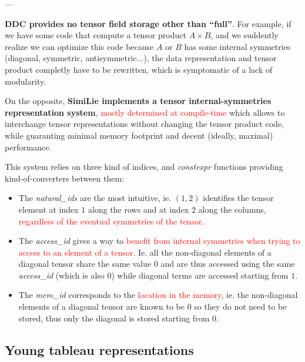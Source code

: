 \documentclass[9pt, svgnames, aspectratio=32, handout]{beamer}
\newenvironment{tframe}[1][]{%
  \begin{frame}[fragile,environment=tframe]{%
    \normalsize{{\bfseries \secname} --- \small{\subsecname} #1}%
  }%
}{%
  \end{frame}%
}
\begin{document}
\begin{tframe}
\textbf{DDC provides no tensor field storage other than ``full''}. For example, if we have some code that compute a tensor product $A\times B$, and we suddently realize we can optimize this code because $A$ or $B$ has some internal symmetries (diagonal, symmetric, antisymmetric...), the data representation and tensor product completly have to be rewritten, which is symptomatic of a lack of modularity.

On the opposite, \textbf{SimiLie implements a tensor internal-symmetries representation system}, \textcolor{red}{mostly determined at compile-time} which allows to interchange tensor representations without changing the tensor product code, while guaranting minimal memory footprint and decent (ideally, maximal) performance.

\small
This system relies on three kind of indices, and \textit{constexpr} functions providing kind-of-converters between them:

\begin{itemize}
\item The \textit{natural\_ids} are the most intuitive, ie. $(1, 2)$ identifies the tensor element at index $1$ along the rows and at index $2$ along the columns, \textcolor{red}{regardless of the eventual symmetries of the tensor}.
\item The \textit{access\_id} gives a way to \textcolor{red}{benefit from internal symmetries when trying to access to an element of a tensor}. Ie. all the non-diagonal elements of a diagonal tensor share the same value $0$ and are thus accessed using the same \textit{access\_id} (which is also $0$) while diagonal terms are accessed starting from $1$.
\item The \textit{mem\_id} corresponds to the \textcolor{red}{location in the memory}, ie. the non-diagonal elements of a diagonal tensor are known to be $0$ so they do not need to be stored, thus only the diagonal is stored starting from $0$.
\end{itemize}
\normalsize

\end{tframe}

\subsection{Young tableau representations}
\end{document}
